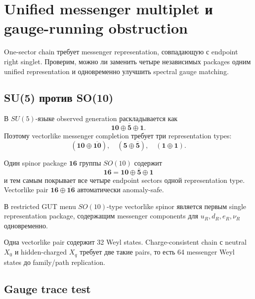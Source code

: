 \chapter{Unified messenger multiplet и gauge-running obstruction}

One-sector chain требует messenger representation, совпадающую с endpoint
right singlet. Проверим, можно ли заменить четыре независимых packages одним
unified representation и одновременно улучшить spectral gauge matching.

\section{SU(5) против SO(10)}

В \(SU(5)\)-языке observed generation раскладывается как
\begin{equation}
\mathbf{10}\oplus\overline{\mathbf5}\oplus\mathbf1.
\end{equation}
Поэтому vectorlike messenger completion требует три representation types:
\begin{equation}
(\mathbf{10}\oplus\overline{\mathbf{10}}),
\quad
(\mathbf5\oplus\overline{\mathbf5}),
\quad
(\mathbf1\oplus\mathbf1).
\end{equation}

Один spinor package \(\mathbf{16}\) группы \(SO(10)\) содержит
\begin{equation}
\mathbf{16}=\mathbf{10}\oplus\overline{\mathbf5}\oplus\mathbf1
\end{equation}
и тем самым покрывает все четыре endpoint sectors одной representation type.
Vectorlike pair \(\mathbf{16}\oplus\overline{\mathbf{16}}\) автоматически
anomaly-safe.

\begin{proposition}
В restricted GUT menu \(SO(10)\)-type vectorlike spinor является первым
single representation package, содержащим messenger components для
\(u_R,d_R,e_R,\nu_R\) одновременно.
\end{proposition}

Одна vectorlike pair содержит 32 Weyl states. Charge-consistent chain с
neutral \(X_0\) и hidden-charged \(X_q\) требует две такие pairs, то есть 64
messenger Weyl states до family/path replication.

\section{Gauge trace test}


